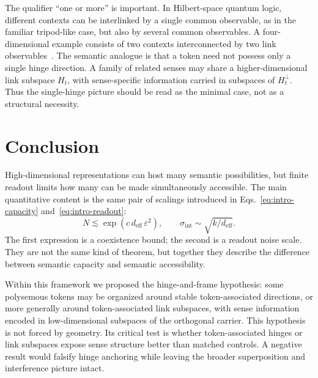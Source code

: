 \documentclass[
  aps,
  reprint,
  superscriptaddress,
  floatfix,
  nofootinbib,
  longbibliography
]{revtex4-2}
\newcommand{\deff}{d_{\mathrm{eff}}}
\newcommand{\sint}{\sigma_{\mathrm{int}}}
\begin{document}
The qualifier ``one or more'' is important. In Hilbert-space quantum
logic, different contexts can be interlinked by a single common
observable, as in the familiar tripod-like case, but also by several
common observables. A four-dimensional example consists of two contexts
interconnected by two link observables~\cite{svozil:040102}.
The semantic analogue is that a token need not possess only a single
hinge direction. A family of related senses may share a
higher-dimensional link subspace $H_t$, with sense-specific information
carried in subspaces of $H_t^\perp$. Thus the single-hinge picture
should be read as the minimal case, not as a structural necessity.

\section{Conclusion}
\label{sec:conclusion}

High-dimensional representations can host many semantic possibilities,
but finite readout limits how many can be made simultaneously
accessible. The main quantitative content is the same pair of scalings
introduced in Eqs.~\eqref{eq:intro-capacity} and~\eqref{eq:intro-readout}:
%
\begin{equation}
\label{eq:summary}
N\lesssim\exp(c\,\deff\,\varepsilon^{2}),
\qquad
\sint\sim\sqrt{k/\deff}.
\end{equation}
%
The first expression is a coexistence bound; the second is a readout
noise scale. They are not the same kind of theorem, but together they
describe the difference between semantic capacity and semantic
accessibility.

Within this framework we proposed the hinge-and-frame hypothesis: some
polysemous tokens may be organized around stable token-associated
directions, or more generally around token-associated link subspaces,
with sense information encoded in low-dimensional subspaces of the
orthogonal carrier. This hypothesis is not forced by geometry. Its
critical test is whether token-associated hinges or link subspaces
expose sense structure better than matched controls. A negative result
would falsify hinge anchoring while leaving the broader superposition
and interference picture intact.
\end{document}
